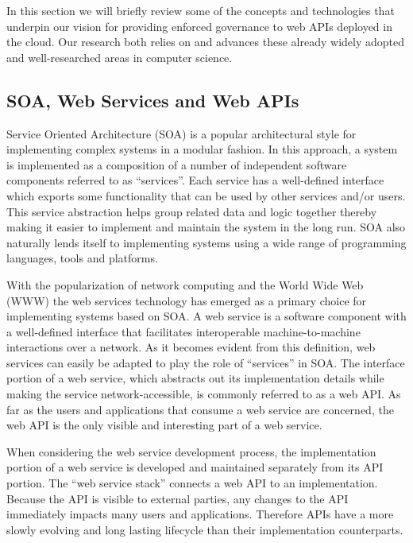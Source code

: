 In this section we will briefly review some of the concepts and technologies that underpin our vision for providing enforced governance to
web APIs deployed in the cloud. Our research both relies on and advances these already widely adopted and well-researched areas in
computer science.

\subsection{SOA, Web Services and Web APIs}
Service Oriented Architecture (SOA) is a popular architectural style for implementing complex systems in a modular fashion. In this approach, 
a system 
is implemented as a composition of a number of independent software components referred to as ``services''. Each service has a well-defined
interface which exports some functionality that can be used by other services and/or users. This service abstraction helps group related data
and logic together thereby making it easier to implement and maintain the system in the long run. SOA also naturally lends itself to implementing
systems using a wide range of programming languages, tools and platforms.

With the popularization of network computing and the World Wide Web (WWW) the web services technology has emerged as a primary choice 
for implementing systems based on SOA. A web service is a
software component with a well-defined interface that facilitates interoperable machine-to-machine interactions over a network. As it becomes 
evident from
this definition, web services can easily be adapted to play the role of  ``services'' in SOA. The interface portion of a web service, which
abstracts out its implementation details while making the service network-accessible, is commonly referred to as 
a web API. As far as the users and applications that consume a web service are concerned, the web API is the only visible and
interesting part of a web service.

When considering the web service development process, the implementation portion of a web service is developed and maintained separately from
its API portion. The ``web service stack'' connects a web API to an implementation. Because the API is visible to external parties, any 
changes to the API immediately impacts many users and applications. Therefore APIs have a more slowly evolving and long lasting lifecycle than 
their implementation counterparts. 

